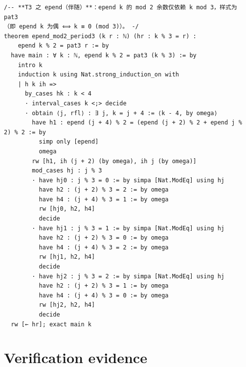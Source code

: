 \documentclass[11pt]{article}
\theoremstyle{definition}
\begin{document}
\begin{lstlisting}
/-- **T3 之 epend（伴随）**：epend k 的 mod 2 余数仅依赖 k mod 3，样式为 pat3
（即 epend k 为偶 ⟺ k ≡ 0 (mod 3)）。 -/
theorem epend_mod2_period3 (k r : ℕ) (hr : k % 3 = r) :
    epend k % 2 = pat3 r := by
  have main : ∀ k : ℕ, epend k % 2 = pat3 (k % 3) := by
    intro k
    induction k using Nat.strong_induction_on with
    | h k ih =>
      by_cases hk : k < 4
      · interval_cases k <;> decide
      · obtain ⟨j, rfl⟩ : ∃ j, k = j + 4 := ⟨k - 4, by omega⟩
        have h1 : epend (j + 4) % 2 = (epend (j + 2) % 2 + epend j % 2) % 2 := by
          simp only [epend]
          omega
        rw [h1, ih (j + 2) (by omega), ih j (by omega)]
        mod_cases hj : j % 3
        · have hj0 : j % 3 = 0 := by simpa [Nat.ModEq] using hj
          have h2 : (j + 2) % 3 = 2 := by omega
          have h4 : (j + 4) % 3 = 1 := by omega
          rw [hj0, h2, h4]
          decide
        · have hj1 : j % 3 = 1 := by simpa [Nat.ModEq] using hj
          have h2 : (j + 2) % 3 = 0 := by omega
          have h4 : (j + 4) % 3 = 2 := by omega
          rw [hj1, h2, h4]
          decide
        · have hj2 : j % 3 = 2 := by simpa [Nat.ModEq] using hj
          have h2 : (j + 2) % 3 = 1 := by omega
          have h4 : (j + 4) % 3 = 0 := by omega
          rw [hj2, h2, h4]
          decide
  rw [← hr]; exact main k
\end{lstlisting}

\section{Verification evidence}
\end{document}
